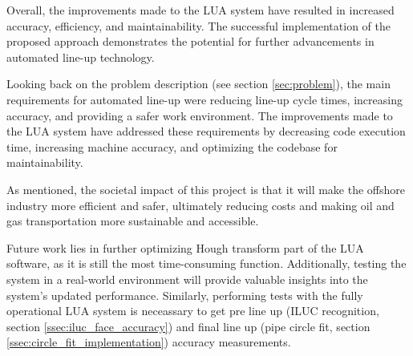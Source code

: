 Overall, the improvements made to the LUA system have resulted in increased accuracy, efficiency, and maintainability. The successful implementation of the proposed approach demonstrates the potential for further advancements in automated line-up technology.

Looking back on the problem description (see section \ref{sec:problem}), the main requirements for automated line-up were reducing line-up cycle times, increasing accuracy, and providing a safer work environment. The improvements made to the LUA system have addressed these requirements by decreasing code execution time, increasing machine accuracy, and optimizing the codebase for maintainability. 

As mentioned, the societal impact of this project is that it will make the offshore industry more efficient and safer, ultimately reducing costs and making oil and gas transportation more sustainable and accessible.

Future work lies in further optimizing Hough transform part of the LUA software, as it is still the most time-consuming function. Additionally, testing the system in a real-world environment will provide valuable insights into the system's updated performance. Similarly, performing tests with the fully operational LUA system is neceassary to get pre line up (ILUC recognition, section \ref{ssec:iluc_face_accuracy}) and final line up (pipe circle fit, section \ref{ssec:circle_fit_implementation}) accuracy measurements.